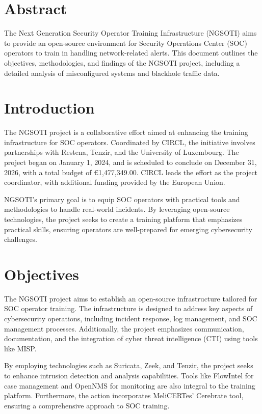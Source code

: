 \chapter*{Abstract}
The Next Generation Security Operator Training Infrastructure (NGSOTI) aims to provide an open-source environment for Security Operations Center (SOC) operators to train in handling network-related alerts. This document outlines the objectives, methodologies, and findings of the NGSOTI project, including a detailed analysis of misconfigured systems and blackhole traffic data.

\tableofcontents

\chapter{Introduction}
The NGSOTI project is a collaborative effort aimed at enhancing the training infrastructure for SOC operators. Coordinated by CIRCL, the initiative involves partnerships with Restena, Tenzir, and the University of Luxembourg. The project began on January 1, 2024, and is scheduled to conclude on December 31, 2026, with a total budget of €1,477,349.00. CIRCL leads the effort as the project coordinator, with additional funding provided by the European Union.

NGSOTI's primary goal is to equip SOC operators with practical tools and methodologies to handle real-world incidents. By leveraging open-source technologies, the project seeks to create a training platform that emphasizes practical skills, ensuring operators are well-prepared for emerging cybersecurity challenges.

\chapter{Objectives}
The NGSOTI project aims to establish an open-source infrastructure tailored for SOC operator training. The infrastructure is designed to address key aspects of cybersecurity operations, including incident response, log management, and SOC management processes. Additionally, the project emphasizes communication, documentation, and the integration of cyber threat intelligence (CTI) using tools like MISP.

By employing technologies such as Suricata, Zeek, and Tenzir, the project seeks to enhance intrusion detection and analysis capabilities. Tools like FlowIntel for case management and OpenNMS for monitoring are also integral to the training platform. Furthermore, the action incorporates MeliCERTes' Cerebrate tool, ensuring a comprehensive approach to SOC training.

